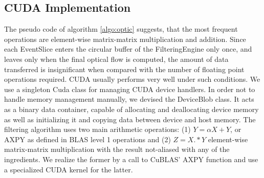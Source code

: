 \subsection{CUDA Implementation}

The pseudo code of algorithm \ref{algo:optic} suggests, that the most frequent operations are element-wise matrix-matrix multiplication and addition.
Since each EventSlice enters the circular buffer of the FilteringEngine only once, and leaves only when the final optical flow is computed, the amount of data transferred is insignificant when compared with the number of floating point operations required.
CUDA usually performs very well under such conditions.
We use a singleton Cuda class for managing CUDA device handlers.
In order not to handle memory management manually, we devised the DeviceBlob class. 
It acts as a binary data container, capable of allocating and deallocating device memory as well as initializing it and copying data between device and host memory. 
The filtering algorithm uses two main arithmetic operations: (1) $Y = \alpha X + Y$, or AXPY as defined in BLAS level 1 operations and (2) $Z = X .* Y$ element-wise matrix-matrix multiplication with the result not-aliased with any of the ingredients. We realize the former by a call to CuBLAS' AXPY function and use a specialized CUDA kernel for the latter.